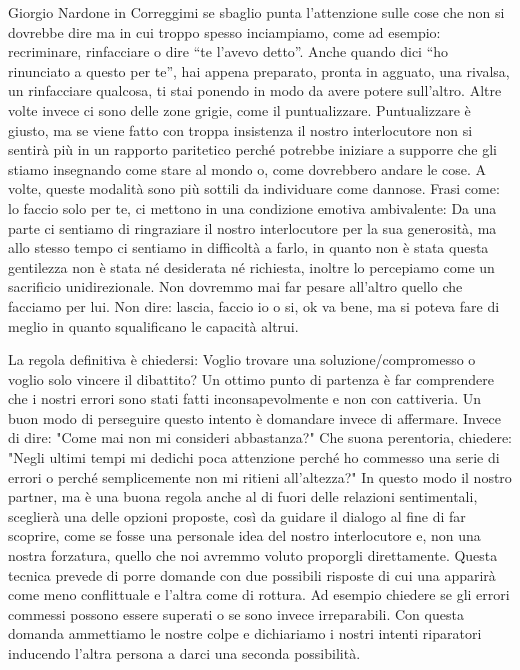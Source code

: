 \documentclass[12pt]{book} %
\begin{document}
Giorgio Nardone in Correggimi se sbaglio punta
l'attenzione sulle cose che non si dovrebbe dire ma in cui troppo spesso inciampiamo, come ad
esempio: recriminare, rinfacciare o dire “te l'avevo detto”. Anche quando dici “ho rinunciato a questo per te”, hai
appena preparato, pronta in agguato, una rivalsa, un rinfacciare qualcosa, ti stai ponendo in modo da avere potere
sull'altro. Altre volte invece ci sono delle zone grigie, come il puntualizzare. Puntualizzare è giusto, ma se viene
fatto con troppa insistenza il nostro interlocutore non si sentirà più in un rapporto paritetico perché potrebbe
iniziare a supporre che gli stiamo insegnando come stare al mondo o, come dovrebbero andare le cose. A volte, queste
modalità sono più sottili da individuare come dannose. Frasi come: lo faccio solo per te, ci mettono in una condizione
emotiva ambivalente: Da una parte ci sentiamo di ringraziare il nostro interlocutore per la sua generosità, ma allo
stesso tempo ci sentiamo in difficoltà a farlo, in quanto non è stata questa gentilezza non è stata né desiderata né
richiesta, inoltre lo percepiamo come un sacrificio unidirezionale. Non dovremmo mai far pesare
all'altro quello che facciamo per lui. Non dire: lascia, faccio io o si, ok va bene, ma si poteva
fare di meglio in quanto squalificano le capacità altrui.

La regola definitiva è chiedersi: Voglio trovare una soluzione/compromesso o voglio solo vincere il dibattito? Un ottimo
punto di partenza è far comprendere che i nostri errori sono stati fatti inconsapevolmente e non con cattiveria. Un
buon modo di perseguire questo intento è domandare invece di affermare. Invece di dire: "Come mai
non mi consideri abbastanza?" Che suona perentoria, chiedere: "Negli ultimi
tempi mi dedichi poca attenzione perché ho commesso una serie di errori o perché semplicemente non mi ritieni
all'altezza?" In questo modo il nostro partner, ma è una buona regola anche
al di fuori delle relazioni sentimentali, sceglierà una delle opzioni proposte, così da guidare il dialogo al fine di
far scoprire, come se fosse una personale idea del nostro interlocutore e, non una nostra forzatura, quello che noi
avremmo voluto proporgli direttamente. Questa tecnica prevede di porre domande con due possibili risposte di cui una
apparirà come meno conflittuale e l'altra come di rottura. Ad esempio chiedere se gli errori
commessi possono essere superati o se sono invece irreparabili. Con questa domanda ammettiamo le nostre colpe e
dichiariamo i nostri intenti riparatori inducendo l'altra persona a darci una seconda possibilità.
\end{document}
